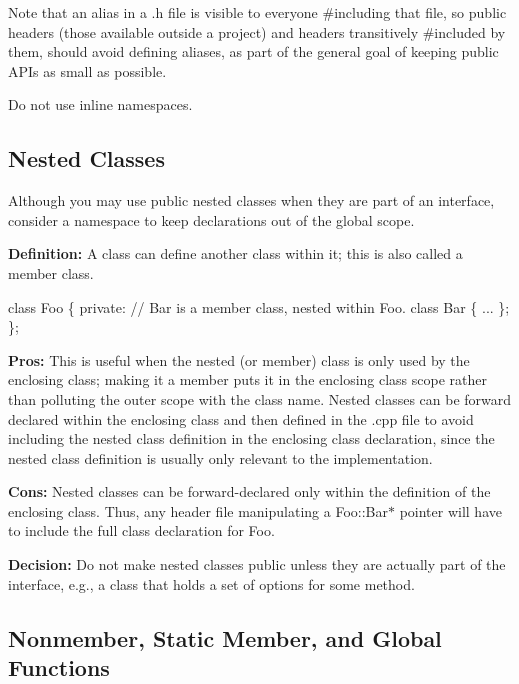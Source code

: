 Note that an alias in a .h file is visible to everyone \#including that file, so public headers (those available outside a project) and headers transitively \#included by them, should avoid defining aliases, as part of the general goal of keeping public A\+P\+Is as small as possible.


\begin{DoxyItemize}
\item Do not use inline namespaces.
\end{DoxyItemize}

\subsection*{Nested Classes}

Although you may use public nested classes when they are part of an interface, consider a namespace to keep declarations out of the global scope.

{\bfseries Definition\+:} A class can define another class within it; this is also called a member class.


\begin{DoxyCode}
\textcolor{keyword}{class }Foo
\{
\textcolor{keyword}{private}:
    \textcolor{comment}{// Bar is a member class, nested within Foo.}
    \textcolor{keyword}{class }Bar
    \{
       ...
    \};
\};
\end{DoxyCode}


{\bfseries Pros\+:} This is useful when the nested (or member) class is only used by the enclosing class; making it a member puts it in the enclosing class scope rather than polluting the outer scope with the class name. Nested classes can be forward declared within the enclosing class and then defined in the .cpp file to avoid including the nested class definition in the enclosing class declaration, since the nested class definition is usually only relevant to the implementation.

{\bfseries Cons\+:} Nested classes can be forward-\/declared only within the definition of the enclosing class. Thus, any header file manipulating a Foo\+::\+Bar$\ast$ pointer will have to include the full class declaration for Foo.

{\bfseries Decision\+:} Do not make nested classes public unless they are actually part of the interface, e.\+g., a class that holds a set of options for some method.

\subsection*{Nonmember, Static Member, and Global Functions}


